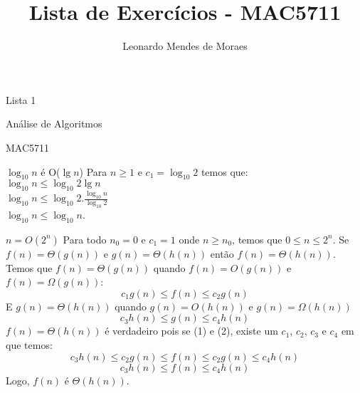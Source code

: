 \documentclass[12pt,a4paper]{article}
\author{Leonardo Mendes de Moraes }
\title{Lista de Exercícios - MAC5711}
\date{}
\begin{document}
	\begin{center}
    {\huge Lista 1 \par} {\LARGE Análise de Algoritmos \par} {\Large MAC5711
    \par}
	\end{center}

\problem
     $\log_{10} n$ é O($\lg n$) 
        \answer Para $n \geq 1$ e $c_1 =
        \log_{10} 2$ temos que: \\
        $\log_{10} n \leq \log_{10}2
        \lg n$ \\
        $\log_{10} n \leq \log_{10}2 . \frac{\log_{10}n}{\log_{10}2}$ \\
        $\log_{10} n \leq \log_{10}n$.


\problem
	 $n = O(2^n)$
        \answer Para todo $n_0 = 0$ e $c_1 = 1$ onde $n \geq n_0$, temos que
        $0 \leq n \leq 2^n$.
\problem
     Se $f(n) =  \Theta(g(n))$ e $g(n) = \Theta(h(n))$ então $f(n)
    = \Theta(h(n))$.
        \answer Temos que $f(n) = \Theta(g(n))$ quando $f(n) =
        O(g(n))$ e $f(n) = \Omega(g(n))$:
        \begin{equation}
            c_1 g(n) \leq f(n) \leq c_2 g(n)
        \end{equation}
        E $g(n) = \Theta(h(n))$ quando $g(n) =
        O(h(n))$ e $g(n) = \Omega(h(n))$
        \begin{equation}
            c_3 h(n) \leq g(n) \leq c_4 h(n)
        \end{equation}
        $f(n) = \Theta(h(n))$ é verdadeiro pois se (1) e (2), existe um $c_1$, $c_2$, $c_3$ e $c_4$ em que temos: 
        \begin{equation}
            c_3 h(n) \leq  c_2 g(n) \leq f(n) \leq  c_2 g(n) \leq c_4 h(n) \nonumber
        \end{equation}
        \begin{equation}
            c_3 h(n) \leq f(n) \leq c_4 h(n) \nonumber
        \end{equation}
        Logo, $f(n)$ é $\Theta(h(n))$.
\end{document}
